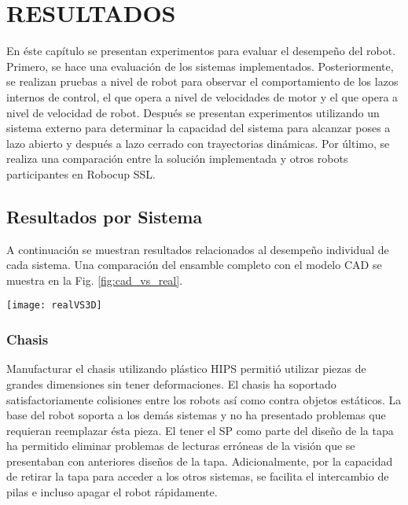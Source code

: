 \chapter{RESULTADOS}
\label{ch:res}

En éste capítulo se presentan experimentos para evaluar el desempeño del robot. Primero, se hace una evaluación de los sistemas implementados. Posteriormente, se realizan pruebas a nivel de robot para observar el comportamiento de los lazos internos de control, el que opera a nivel de velocidades de motor y el que opera a nivel de velocidad de robot. Después se presentan experimentos utilizando un sistema externo para determinar la capacidad del sistema para alcanzar poses a lazo abierto y después a lazo cerrado con trayectorias dinámicas. Por último, se realiza una comparación entre la solución implementada y otros robots participantes en Robocup \gls{SSL}.





\section{Resultados por Sistema}
A continuación se muestran resultados relacionados al desempeño individual de cada sistema. Una comparación del ensamble completo con el modelo \gls{CAD} se muestra en la Fig. \ref{fig:cad_vs_real}.

\begin{sidewaysfigure}
	\centering
		\texttt{[image: realVS3D]}
	\caption{Robot Real vs Modelo CAD}
	\label{fig:cad_vs_real}
\end{sidewaysfigure}

\subsection{Chasis}
Manufacturar el chasis utilizando plástico \gls{HIPS} permitió utilizar piezas de grandes dimensiones sin tener deformaciones. El chasis ha soportado satisfactoriamente colisiones entre los robots así como contra objetos estáticos. La base del robot soporta a los demás sistemas y no ha presentado problemas que requieran reemplazar ésta pieza. El tener el \gls{SP} como parte del diseño de la tapa ha permitido eliminar problemas de lecturas erróneas de la visión que se presentaban con anteriores diseños de la tapa. Adicionalmente, por la capacidad de retirar la tapa para acceder a los otros sistemas, se facilita el intercambio de pilas e incluso apagar el robot rápidamente.

